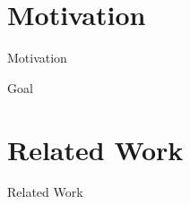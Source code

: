 \begin{frame}[t,plain]
\titlepage
\end{frame}

  
\section{Motivation}
\begin{frame}[t]{Motivation}

\end{frame}


\begin{frame}[t]{Goal}
  
\end{frame}

\section{Related Work}
\begin{frame}[t]{Related Work}
  
  
\end{frame}

